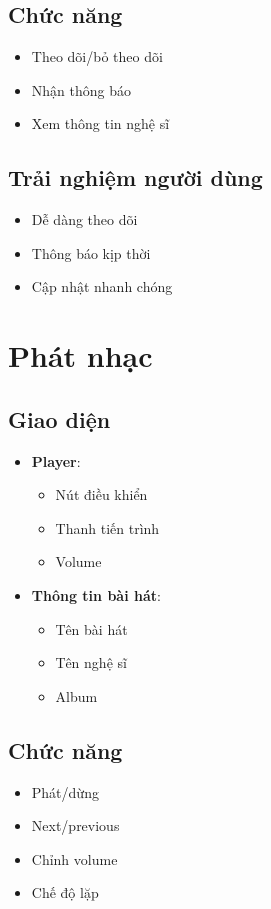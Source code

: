 \documentclass{article}
\begin{document}
\subsection{Chức năng}
\begin{itemize}
    \item Theo dõi/bỏ theo dõi
    \item Nhận thông báo
    \item Xem thông tin nghệ sĩ
\end{itemize}

\subsection{Trải nghiệm người dùng}
\begin{itemize}
    \item Dễ dàng theo dõi
    \item Thông báo kịp thời
    \item Cập nhật nhanh chóng
\end{itemize}

\section{Phát nhạc}
\subsection{Giao diện}
\begin{itemize}
    \item \textbf{Player}:
    \begin{itemize}
        \item Nút điều khiển
        \item Thanh tiến trình
        \item Volume
    \end{itemize}
    \item \textbf{Thông tin bài hát}:
    \begin{itemize}
        \item Tên bài hát
        \item Tên nghệ sĩ
        \item Album
    \end{itemize}
\end{itemize}

\subsection{Chức năng}
\begin{itemize}
    \item Phát/dừng
    \item Next/previous
    \item Chỉnh volume
    \item Chế độ lặp
\end{itemize}
\end{document}

